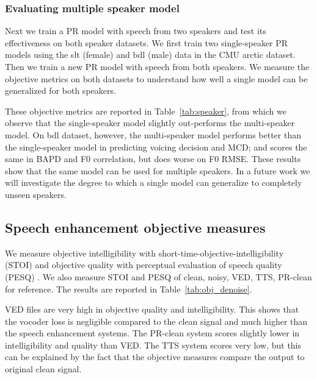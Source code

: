 \documentclass{article}
\begin{document}
\subsubsection{Evaluating multiple speaker model}
Next we train a PR model with speech from two speakers and test its effectiveness on both speaker datasets. We first train two single-speaker PR models using the slt (female) and bdl (male) data in the CMU arctic dataset. Then we train a new PR model with speech from both speakers. We measure the objective metrics on both datasets to understand how well a single model can be generalized for both speakers. 

These objective metrics are reported in Table~\ref{tab:speaker}, from which we observe that the single-speaker model slightly out-performs the multi-speaker model. On bdl dataset, however, the multi-speaker model performs better than the single-speaker model in predicting voicing decision and MCD; and scores the same in BAPD and F0 correlation, but does worse on F0 RMSE. %
These results show that the same model can be used for multiple speakers.  In a future work we will investigate the degree to which a single model can generalize to completely unseen speakers.


\subsection{Speech enhancement objective measures}

We measure objective intelligibility with short-time-objective-intelligibility (STOI) \cite{taal2010short} and objective quality with perceptual evaluation of speech quality (PESQ) \cite{rix2001perceptual}. We also measure STOI and PESQ of clean, noisy, VED, TTS, PR-clean for reference. The results are reported in Table~\ref{tab:obj_denoise}. 


VED files are very high in objective quality and intelligibility. This shows that the vocoder loss is negligible compared to the clean signal and much higher than the speech enhancement systems. The PR-clean system scores slightly lower in intelligibility and quality than VED. The TTS system scores very low, but this can be explained by the fact that the objective measures compare the output to original clean signal. 
\end{document}
